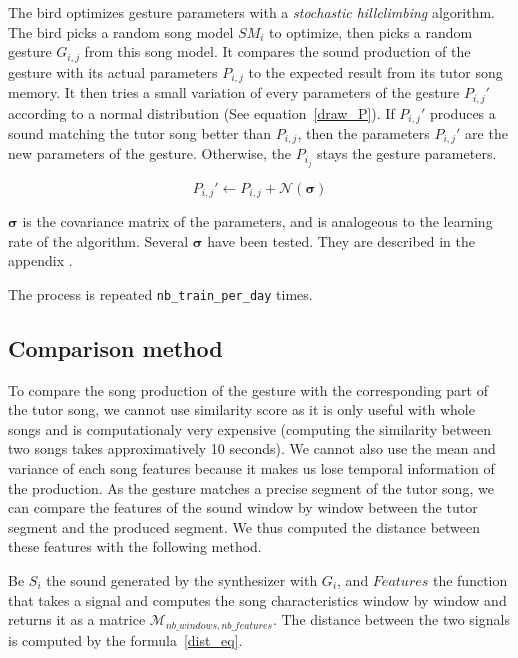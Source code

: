 \documentclass{report}
\begin{document}
The bird optimizes gesture parameters with a \emph{stochastic hillclimbing}
algorithm. The bird picks a random song model $SM_i$ to optimize, then picks a
random gesture $G_{i,j}$ from this song model. It compares the sound production
of the gesture with its actual parameters \(P_{i,j}\) to the expected result
from its tutor song memory. It then tries a small variation of every parameters
of the gesture \(P_{i, j}'\) according to a normal distribution (See
equation~\ref{draw_P}). If \(P_{i, j}'\) produces a sound matching the tutor
song better than \(P_{i, j}\), then the parameters \(P_{i, j}'\) are the new
parameters of the gesture. Otherwise, the \(P_{i_j}\) stays the gesture
parameters.

\begin{equation}
  P_{i, j}' \leftarrow P_{i, j} + \mathcal{N}(\pmb \sigma) \label{draw_P}
\end{equation}

\(\pmb \sigma\) is the covariance matrix of the parameters, and is analogeous to
the learning rate of the algorithm. Several \(\pmb \sigma\) have been tested.
They are described in the appendix \todo{}.

The process is repeated \texttt{nb\_train\_per\_day} times.


\subsection{Comparison method}

To compare the song production of the gesture with the corresponding part of the
tutor song, we cannot use similarity score as it is only useful with whole songs
\parencite{tchernichovski_procedure_2000} and is computationaly very expensive
(computing the similarity between two songs takes approximatively 10 seconds).
We cannot also use the mean and variance of each song features because it makes
us lose temporal information of the production. As the gesture matches a precise
segment of the tutor song, we can compare the features of the sound window by
window between the tutor segment and the produced segment. We thus computed the
distance between these features with the following method.

Be $S_i$ the sound generated by the synthesizer with $G_i$, and $Features$ the
function that takes a signal and computes the song characteristics window by
window and returns it as a matrice $\mathcal{M}_{nb\_windows, nb\_features}$.
The distance between the two signals is computed by the formula~\ref{dist_eq}.
\end{document}
